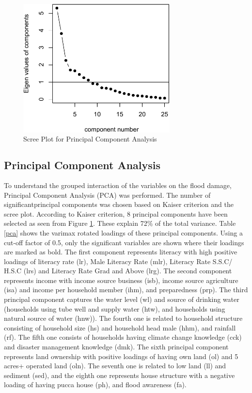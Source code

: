 \documentclass[preprint,review,12pt]{elsarticle}
\begin{document}
\begin{figure}[!ht]
  \centering
    \includegraphics[height=7cm, keepaspectratio]{screePlot.pdf}
    \caption{Scree Plot for Principal Component Analysis}
    \label{scree}
\end{figure}

\subsection{Principal Component Analysis}
To understand the grouped interaction of the variables on the flood damage, Principal Component Analysis (PCA) was performed. The number of significantprincipal components was chosen based on Kaiser criterion and the scree plot. According to Kaiser criterion, 8 principal components have been selected as seen from Figure \ref{scree}. These explain 72\% of the total variance. Table \ref{pca} shows the varimax rotated loadings of these principal components. Using a cut-off factor of 0.5, only the significant variables are shown where their loadings are marked as bold. The first component represents literacy with high positive loadings of literacy rate (lr), Male Literacy Rate (mlr), Literacy Rate S.S.C/ H.S.C (lrs) and Literacy Rate Grad and Above (lrg). The second component represents income with income source business (isb), income source agriculture (isa) and income per household member (ihm), and preparedness (prp). The third principal component captures the water level (wl) and source of drinking water (households using tube well and supply water (htw), and households using natural source of water (hnw)). The fourth one is related to household structure consisting of household size (hs) and household head male (hhm), and rainfall (rf). The fifth one consists of households having climate change knowledge (cck) and disaster management knowledge (dmk). The sixth principal component represents land ownership with positive loadings of having own land (ol) and 5 acres+ operated land (oln). The seventh one is related to low land (ll) and sediment (sed), and the eighth one represents house structure with a negative loading of having pucca house (ph), and flood awareness (fa). 
\end{document}
